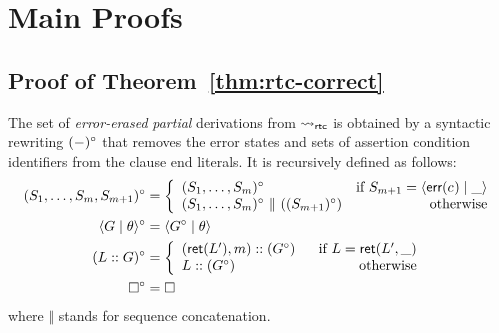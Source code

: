 \documentclass{llncs}
\begin{document}
\section{Main Proofs}
\label{app:proofs}

\subsection{Proof of Theorem~\ref{thm:rtc-correct}}

\begin{definition}
  \label{def:error-erased-derivation}
  The set of \emph{error-erased} \emph{partial}
  derivations from $ \leadsto_{\mathsf{rtc}} $ is
  obtained by a syntactic rewriting $(-)^{\circ}$ that removes
  the error states and sets of assertion condition identifiers from
  the clause end literals.
  It is recursively defined as follows:
  \begin{align*}
    (S_1, \dots, S_m, S_{m+1})^{\circ}
  &= \left\{
      \begin{array}{lr}
        (S_1, \dots, S_m)^{\circ}
      &
        \text{if}~ S_{m+1} = \langle \textsf{err}(c_{}) \mid{} \_ \rangle
      \\
        (S_1, \dots, S_m)^{\circ} ~\Vert~
        ((S_{m+1})^{\circ})
      &
        \text{otherwise}
      \end{array}
    \right.
  \\
    \langle G \mid{} \theta \rangle^{\circ}
  &= \langle G^{\circ} \mid{} \theta \rangle
  \\
    (L::G)^{\circ}
  &= \left\{
      \begin{array}{lr}
        (\textsf{ret}(L'),m)::(G^{\circ})
                            & \text{~~if}~ L = \textsf{ret}(L',\_)
      \\
        L::(G^{\circ}) & \text{~~otherwise}
      \end{array}
    \right.
  \\
    \square^{\circ}
  &= \square
  \end{align*}
  \noindent where $\Vert$ stands for sequence concatenation.
  \end{definition}
\end{document}
